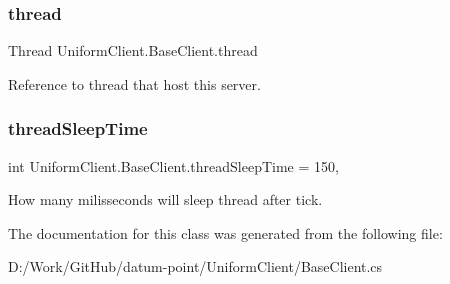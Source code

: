 \subsubsection{\texorpdfstring{thread}{thread}}
{\footnotesize\ttfamily Thread Uniform\+Client.\+Base\+Client.\+thread}



Reference to thread that host this server. 

\mbox{\label{class_uniform_client_1_1_base_client_a2c4762c1be5eac42b8b5d189530d0952}} 
\subsubsection{\texorpdfstring{thread\+Sleep\+Time}{threadSleepTime}}
{\footnotesize\ttfamily int Uniform\+Client.\+Base\+Client.\+thread\+Sleep\+Time = 150\hspace{0.3cm}{\ttfamily [static]}, {\ttfamily [protected]}}



How many milisseconds will sleep thread after tick. 



The documentation for this class was generated from the following file\+:\begin{DoxyCompactItemize}
\item 
D\+:/\+Work/\+Git\+Hub/datum-\/point/\+Uniform\+Client/Base\+Client.\+cs\end{DoxyCompactItemize}
